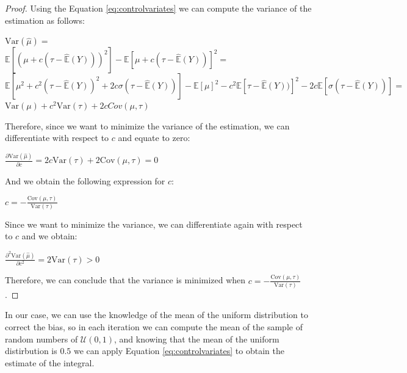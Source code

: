 \documentclass{report}
\begin{document}
\begin{proof}
	Using the Equation \eqref{eq:controlvariates} we can compute the variance of the estimation as follows:
	\begin{center}
		\(\mathrm{Var}(\hat{\mu}) = \) \\

		\(\mathbb{E}[(\mu + c(\tau - \hat{\mathbb{E}}(Y)))^2] - \mathbb{E}[\mu + c(\tau - \hat{\mathbb{E}}(Y))]^2 =\) \\

		\(\mathbb{E}[\mu^2 + c^2(\tau - \hat{\mathbb{E}}(Y))^2 + 2c\sigma(\tau - \hat{\mathbb{E}}(Y))]  - \mathbb{E}[\mu]^2 - c^2\mathbb{E}[\tau - \hat{\mathbb{E}}(Y))]^2 - 2c\mathbb{E}[\sigma(\tau - \hat{\mathbb{E}}(Y))]  =\) \\

		\(\mathrm{Var}(\mu) + c^2 \mathrm{Var}(\tau) + 2cCov(\mu, \tau)\) 
	\end{center}
	Therefore, since we want to minimize the variance of the estimation, we can differentiate with respect to \(c\) and equate to zero:
	\begin{center}
		\(\frac{\partial \mathrm{Var}(\hat{\mu})}{\partial c} = 2c \mathrm{Var}(\tau) + 2\mathrm{Cov}(\mu, \tau ) = 0\) \\
	\end{center}
	And we obtain the following expression for \(c\):
	\begin{center}
		\(c = -\frac{\mathrm{Cov}(\mu, \tau)}{\mathrm{Var}(\tau)}\) 
	\end{center}

	Since we want to minimize the variance, we can differentiate again with respect to \(c\) and we obtain:

	\begin{center}
		\(\frac{\partial^2 \mathrm{Var}(\hat{\mu})}{\partial c^2} = 2\mathrm{Var}(\tau) > 0\) \\
	\end{center}

	Therefore, we can conclude that the variance is minimized when \(c = -\frac{\mathrm{Cov}(\mu, \tau)}{\mathrm{Var}(\tau)}\).

\end{proof}

In our case, we can use the knowledge of the mean of the uniform distribution to correct the bias, so in each iteration we can compute the mean of the sample of random numbers of \(\mathcal{U}(0,1)\), and knowing that the mean of the uniform distirbution is \(0.5\) we can apply Equation \eqref{eq:controlvariates} to obtain the estimate of the integral. 
\end{document}
